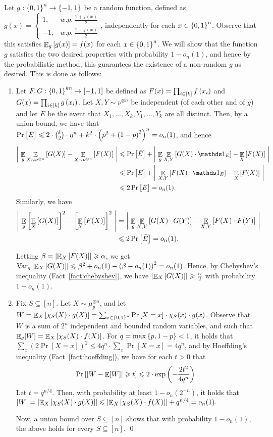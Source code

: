Let $g:\left\{ 0,1 \right\}^n \to \left\{ -1,1 \right\}$ be a random function, defined as $g(x) = \begin{cases} 1, & w.p.\  \frac{1+f(x)}{2} \\ -1, & w.p.\  \frac{1-f(x)}{2} \end{cases}$, independently for each $x\in \left\{ 0,1 \right\}^n$.
Observe that this satisfies $\mathop{\mathbb{E}}_{g}\left[ g(x) \right] = f(x)$ for each $x\in \left\{ 0,1 \right\}^n$.
We will show that the function $g$ satisfies the two desired properties with probability $1-o_n(1)$, and hence by the probabilistic method, this guarantees the existence of a non-random $g$ as desired.
This is done as follows:
\begin{enumerate}
	\item Let $F,G:\left\{ 0,1 \right\}^{kn}\to [-1,1]$ be defined as $F(x) = \prod_{i\in [k]}f\left( x_i \right)$ and $G(x) = \prod_{i\in [k]}g\left( x_i \right)$.
		Let $X,Y \sim \nu^{\otimes n}$ be independent (of each other and of $g$) and let $E$ be the event that $X_1, \dots, X_k, Y_1, \dots, Y_k$ are all distinct.
		Then, by a union bound, we have that $\Pr\left[ \bar E \right] \leqslant 2\cdot \binom{k}{2} \cdot \eta^n + k^2\cdot \left( p^2+\left( 1-p \right)^2 \right)^n = o_n(1)$, and hence
		\begin{align*}
			\abs{\ \E_{g} \E_{X\sim \nu^{\otimes n}}\sqbrac{G(X)}-\E_{X\sim \nu^{\otimes n}}\sqbrac{F(X)}\ } 
			&\leq \Pr\sqbrac{\bar E} + \abs{\  \E_{g}\E_{X,Y}\sqbrac{G(X)\cdot \ind_{E}}-\E_{X}\sqbrac{F(X)}\ }
			\\&\leq \Pr\sqbrac{\bar E} + \abs{\ \E_{X,Y}\sqbrac{F(X)\cdot \ind_{E}}-\E_{X}\sqbrac{F(X)}\ } 
			\\&\leq 2\Pr\sqbrac{\bar E} = o_n(1).
		\end{align*}
		Similarly, we have
		\begin{align*}
			\left|\ \mathop{\mathbb{E}}_{g} \left[ \mathop{\mathbb{E}}_{X}\left[ G(X) \right] \right]^2-\left[ \mathop{\mathbb{E}}_{X}\left[ F(X) \right] \right]^2\ \right| &= \left|\ \mathop{\mathbb{E}}_{g} \mathop{\mathbb{E}}_{X,Y}\left[ G(X)\cdot G(Y) \right]-\mathop{\mathbb{E}}_{X,Y}\left[ F(X)\cdot F(Y) \right]\ \right| \\&\leqslant 2\Pr\left[ \bar E \right] = o_n(1).
		\end{align*}
		
		Letting $\beta = \left|\mathop{\mathbb{E}}_{X}\left[ F(X) \right]\right| \geqslant \alpha$, we get 
		$ \textnormal{Var}_g\left[ \mathop{\mathbb{E}}_{X}\left[ G(X) \right] \right] \leqslant \beta^2+o_n(1) - \left( \beta-o_n(1) \right)^2 = o_n(1)$.
		Hence, by Chebyshev's inequality (Fact~\ref{fact:chebyshev}), we have $\left|\mathop{\mathbb{E}}_{X}\left[ G(X) \right]\right| \geqslant \frac{\alpha}{2}$ with probability $1-o_n(1)$.
		
	\item Fix $S \subseteq [n]$. Let $X\sim \mu_p^{\otimes n}$, and let $W = \mathop{\mathbb{E}}_{X}\left[ \chi_S(X)\cdot g(X) \right] = \sum_{x\in \left\{ 0,1 \right\}^n}\Pr\left[ X=x \right] \cdot \chi_S(x)\cdot g(x)$. Observe that $W$ is a sum of $2^n$ independent and bounded random variables, and such that $\mathop{\mathbb{E}}_g[W] = \mathop{\mathbb{E}}_{X}\left[ \chi_S(X)\cdot f(X) \right]$. For $q = \max\left\{ p,1-p \right\}<1$, it holds that $\sum_x (2\Pr[X=x])^2 \leq 4q^n\cdot \sum_x\Pr[X=x] = 4q^n$, and by Hoeffding's inequality (Fact~\ref{fact:hoeffding}), we have for each $t>0$ that
	\[ \Pr\left[  \left|W-\mathop{\mathbb{E}}[W]\right|\geqslant t \right] \leqslant 2\cdot \exp\left( -\frac{2t^2}{4q^n} \right). \]
	Let $t=q^{n/4}$.
	Then, with probability at least $1-o_n(2^{-n})$, it holds that $\left|W\right| = \left|\mathop{\mathbb{E}}_{X}\left[ \chi_S(X)\cdot g(X) \right]\right| \leqslant \left|\mathop{\mathbb{E}}_{X}\left[ \chi_S(X)\cdot f(X) \right]\right|+q^{n/4} = o_n(1).$
	
	Now, a union bound over $S\subseteq[n]$ shows that with probability $1-o_n(1)$, the above holds for every $S\subseteq [n]$.
	\qed
\end{enumerate}
